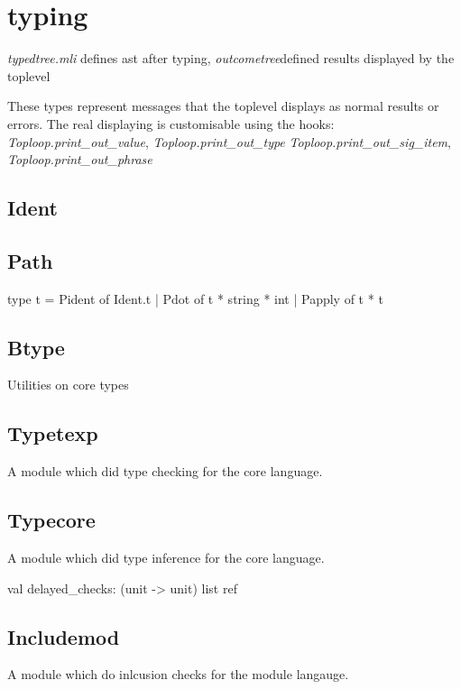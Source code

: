 \section{typing}

\textit{typedtree.mli} defines ast after typing,
\textit{outcometree}defined results displayed by the toplevel

These types represent messages that the toplevel displays as normal
results or errors. The real displaying is customisable using the
hooks: \textit{Toploop.print\_out\_value},
\textit{Toploop.print\_out\_type}
\textit{Toploop.print\_out\_sig\_item},
\textit{Toploop.print\_out\_phrase}


\subsection{Ident}

\subsection{Path}
\begin{ocamlcode}
type t =
    Pident of Ident.t
  | Pdot of t * string * int
  | Papply of t * t
\end{ocamlcode}

\subsection{Btype}
Utilities on core types

\subsection{Typetexp}
A module which did type checking for the core language.


\subsection{Typecore}
A module which did type inference for the core language.


\begin{ocamlcode}
val delayed_checks: (unit -> unit) list ref 
\end{ocamlcode}

\subsection{Includemod}

A module which do inlcusion checks for the module langauge.

